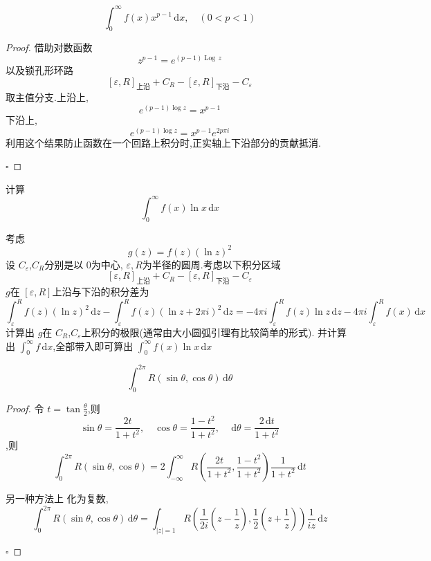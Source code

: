 \documentclass[../../复变函数.tex]{subfiles}
\begin{document}
\begin{method}
    \[
    \int_{0}^{\infty}f\left( x \right)x^{p-1}\,\mathrm{d} x,\quad \left( 0< p< 1 \right)  
    \]
\end{method}
\begin{proof}
    借助对数函数 \[
    z^{p-1}= e^{\left( p-1 \right)\operatorname{Log}\,z }
    \]以及锁孔形环路\[
    [ \varepsilon ,R ]_{\text{上沿}}+ C_{R}- [ \varepsilon ,R]_{\text{下沿}}-C_{ \varepsilon }
    \] 取主值分支.上沿上, \[
    e^{\left( p-1 \right)\log z }= x^{p-1}
    \]下沿上, \[
    e^{\left( p-1 \right)\log z }= x^{p-1} e^{2p \pi i}
    \]利用这个结果防止函数在一个回路上积分时,正实轴上下沿部分的贡献抵消.

    \hfill $\square$
\end{proof}
\begin{method}
  计算  \[
    \int_{0}^{\infty} f\left( x \right) \ln x \,\mathrm{d} x 
    \]
\end{method}
\begin{solution}
    考虑 \[
    g\left( z \right)= f\left( z \right) \left( \ln z \right)^{2}   
    \]设 \(  C_{ \varepsilon }  \),\(  C_{R}  \)分别是以 \(  0  \)为中心, \(   \varepsilon ,R  \)为半径的圆周.考虑以下积分区域 \[
    [ \varepsilon ,R ]_{\text{上沿}}+ C_{R}- [ \varepsilon ,R]_{\text{下沿}}-C_{ \varepsilon }
    \]   \(  g  \)在 \(  [ \varepsilon ,R]  \)上沿与下沿的积分差为 \[
    \int_{ \varepsilon }^{R}f\left( z \right)\left( \ln z \right)^{2}\,\mathrm{d} z- \int_{ \varepsilon }^{R}f\left( z \right)\left( \ln z+ 2\pi i \right)^{2}\,\mathrm{d} z= -4\pi i \int_{ \varepsilon }^{R}f\left( z \right)\ln z\,\mathrm{d} z -4\pi i \int_{ \varepsilon }^{R}f\left( x \right)\,\mathrm{d} x      
    \]  计算出 \(  g  \)在 \(  C_{R}  \),\(  C_{ \varepsilon }  \)上积分的极限(通常由大小圆弧引理有比较简单的形式).   并计算出 \(  \int_{0}^{\infty} f\,\mathrm{d} x \),全部带入即可算出 \(  \int_{0}^{\infty}f\left( x \right)\ln x\,\mathrm{d} x   \)  
\end{solution}

\hspace*{\fill} 

\begin{method}
    \[
    \int_{0}^{2\pi }R\left( \sin  \theta ,\cos  \theta  \right)\,\mathrm{d}  \theta  
    \]
\end{method}
\begin{proof}
    令 \(  t= \tan \frac{ \theta  }{2 }   \),则 \[
    \sin  \theta = \frac{2t }{1+ t^{2} },\quad \cos  \theta = \frac{1-t^{2} }{1+ t^{2} },\quad \,\mathrm{d}  \theta = \frac{2\,\mathrm{d} t }{1+ t^{2} }   
    \],则 \[
    \int_{0}^{2\pi }R\left( \sin  \theta ,\cos  \theta  \right)= 2\int_{-\infty}^{\infty}R\left( \frac{2t }{1+ t^{2} },\frac{1-t^{2} }{1+ t^{2} }   \right)\frac{1 }{1+ t^{2} }\,\mathrm{d} t   
    \] 

    另一种方法上 化为复数, \[
    \int_{0}^{2\pi }R\left( \sin  \theta ,\cos  \theta  \right)\,\mathrm{d}  \theta = \int_{\left| z \right|= 1 } R\left( \frac{1 }{2i }\left( z-\frac{1 }{z }  \right),\frac{1 }{2 }\left( z+ \frac{1 }{z }  \right)     \right)  \frac{1 }{iz }\,\mathrm{d} z 
    \]

    \hfill $\square$
\end{proof}
\end{document}
